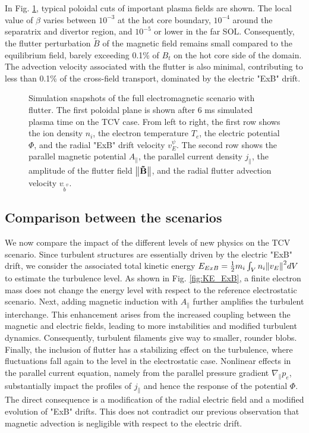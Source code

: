 In Fig. \ref{fig:EMsnapshots}, typical poloidal cuts of important plasma fields are shown. The local value of $\beta$ varies between $10^{-3}$ at the hot core boundary, $10^{-4}$ around the separatrix and divertor region, and $10^{-5}$ or lower in the far SOL. Consequently, the flutter perturbation $\tilde{B}$ of the magnetic field remains small compared to the equilibrium field, barely exceeding 0.1\% of $B_t$ on the hot core side of the domain. The advection velocity associated with the flutter is also minimal, contributing to less than 0.1\% of the cross-field transport, dominated by the electric "ExB" drift. \newline

\begin{figure}[H]\centering
	\centering
	\caption{Simulation snapshots of the full electromagnetic scenario with flutter. The first poloidal plane is shown after 6 ms simulated plasma time on the TCV case. From left to right, the first row shows the ion density $n_i$, the electron temperature $T_e$, the electric potential $\Phi$, and the radial "ExB" drift velocity $v_E^\psi$. The second row shows the parallel magnetic potential $A_\parallel$, the parallel current density $j_\parallel$, the amplitude of the flutter field $\norm{\mathbf{\tilde{B}}}$, and the radial flutter advection velocity $v_{\tilde{b}^\psi}$.}
	\label{fig:EMsnapshots}
\end{figure}



\subsection{Comparison between the scenarios}

We now compare the impact of the different levels of new physics on the TCV scenario. Since turbulent structures are essentially driven by the electric "ExB" drift, we consider the associated total kinetic energy $E_{ExB} = \frac{1}{2}m_i \int_V n_i \norm{v_E}^2 dV$ to estimate the turbulence level. As shown in Fig. \ref{fig:KE_ExB}, a finite electron mass does not change the energy level with respect to the reference electrostatic scenario. Next, adding magnetic induction with $A_\parallel$ further amplifies the turbulent interchange. This enhancement arises from the increased coupling between the magnetic and electric fields, leading to more instabilities and modified turbulent dynamics. Consequently, turbulent filaments give way to smaller, rounder blobs. Finally, the inclusion of flutter has a stabilizing effect on the turbulence, where fluctuations fall again to the level in the electrostatic case. Nonlinear effects in the parallel current equation, namely from the parallel pressure gradient $\nabla_\parallel p_e$, substantially impact the profiles of $j_\parallel$ and hence the response of the potential $\Phi$. The direct consequence is a modification of the radial electric field and a modified evolution of "ExB" drifts. This does not contradict our previous observation that magnetic advection is negligible with respect to the electric drift. \newline

